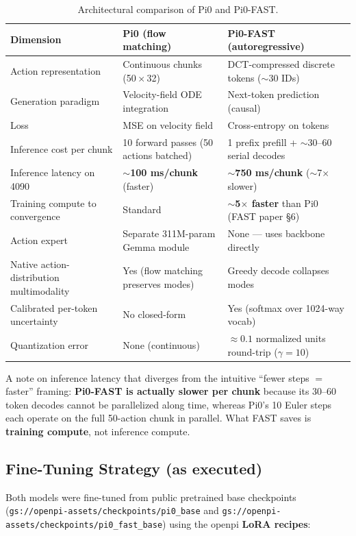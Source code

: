 \documentclass[11pt,letterpaper]{article}
\begin{document}
\begin{table}[h]
\centering
\small
\caption{Architectural comparison of Pi0 and Pi0-FAST.}
\begin{tabularx}{\textwidth}{lXX}
\toprule
\textbf{Dimension} & \textbf{Pi0} (flow matching) & \textbf{Pi0-FAST} (autoregressive) \\
\midrule
Action representation & Continuous chunks (50\,$\times$\,32) & DCT-compressed discrete tokens ($\sim$30 IDs) \\
Generation paradigm & Velocity-field ODE integration & Next-token prediction (causal) \\
Loss & MSE on velocity field & Cross-entropy on tokens \\
Inference cost per chunk & 10 forward passes (50 actions batched) & 1 prefix prefill + $\sim$30--60 serial decodes \\
Inference latency on 4090 & \textbf{$\sim$100 ms/chunk} (faster) & \textbf{$\sim$750 ms/chunk} ($\sim$7$\times$ slower) \\
Training compute to convergence & Standard & \textbf{$\sim$5$\times$ faster} than Pi0 (FAST paper \S6) \\
Action expert & Separate 311M-param Gemma module & None --- uses backbone directly \\
Native action-distribution multimodality & Yes (flow matching preserves modes) & Greedy decode collapses modes \\
Calibrated per-token uncertainty & No closed-form & Yes (softmax over 1024-way vocab) \\
Quantization error & None (continuous) & $\approx 0.1$ normalized units round-trip ($\gamma{=}10$) \\
\bottomrule
\end{tabularx}
\end{table}

A note on inference latency that diverges from the intuitive ``fewer steps $=$ faster'' framing: \textbf{Pi0-FAST is actually slower per chunk} because its 30--60 token decodes cannot be parallelized along time, whereas Pi0's 10 Euler steps each operate on the full 50-action chunk in parallel. What FAST saves is \textbf{training compute}, not inference compute.

\subsection{Fine-Tuning Strategy (as executed)}

Both models were fine-tuned from public pretrained base checkpoints (\texttt{gs://openpi-assets/checkpoints/pi0\_base} and \texttt{gs://openpi-assets/checkpoints/pi0\_fast\_base}) using the openpi \textbf{LoRA recipes}:
\end{document}
